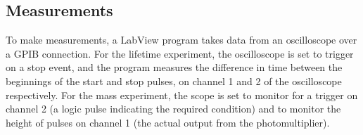 \subsection{Measurements}
\label{measurements}
To make measurements, a LabView program takes data from an oscilloscope over a GPIB connection. For the lifetime experiment, the oscilloscope is set to trigger on a stop event, and the program measures the difference in time between the beginnings of the start and stop pulses, on channel 1 and 2 of the oscilloscope respectively. For the mass experiment, the scope is set to monitor for a trigger on channel 2 (a logic pulse indicating the required condition) and to monitor the height of pulses on channel 1 (the actual output from the photomultiplier).